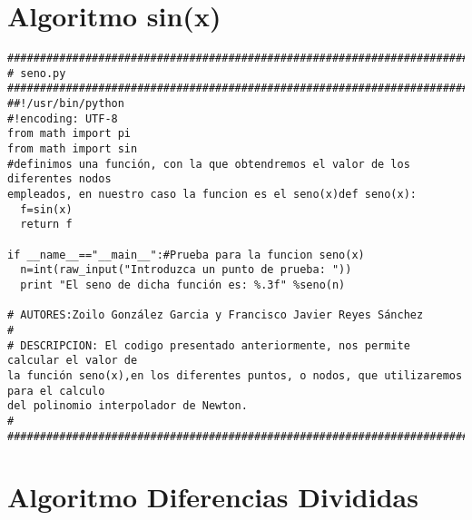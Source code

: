 \section{Algoritmo sin(x)}
\label{Apendice1:XXX}

\begin{center}
\begin{footnotesize}
\begin{verbatim}
###################################################################################
# seno.py
###################################################################################
##!/usr/bin/python
#!encoding: UTF-8
from math import pi
from math import sin
#definimos una función, con la que obtendremos el valor de los diferentes nodos
empleados, en nuestro caso la funcion es el seno(x)def seno(x):
  f=sin(x)
  return f
  
if __name__=="__main__":#Prueba para la funcion seno(x)
  n=int(raw_input("Introduzca un punto de prueba: "))
  print "El seno de dicha función es: %.3f" %seno(n)
  
# AUTORES:Zoilo González Garcia y Francisco Javier Reyes Sánchez
#  
# DESCRIPCION: El codigo presentado anteriormente, nos permite calcular el valor de
la función seno(x),en los diferentes puntos, o nodos, que utilizaremos para el calculo
del polinomio interpolador de Newton.
#
###################################################################################
\end{verbatim}
\end{footnotesize}
\end{center}

\section{Algoritmo Diferencias Divididas}
\label{Apendice1:YYY}

